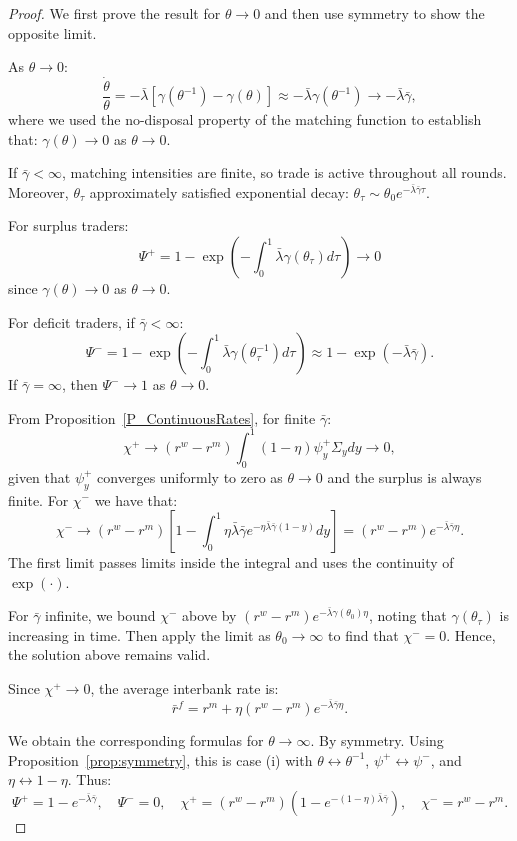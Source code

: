 
\begin{proof}
We first prove the result for $\theta \to 0$ and then use symmetry to show the opposite limit.

As $\theta \to 0$:
\[
\frac{\dot{\theta}}{\theta} = -\bar{\lambda}[\gamma(\theta^{-1}) - \gamma(\theta)] \approx -\bar{\lambda}\gamma(\theta^{-1}) \to -\bar{\lambda}\bar{\gamma},
\]
where we used the no-disposal property of the matching function to establish that: $\gamma(\theta)\to 0$ as $\theta \to 0$. 

If $\bar{\gamma} < \infty$, matching intensities are finite, so trade is active throughout all rounds. Moreover, $\theta_{\tau}$ approximately satisfied exponential decay: $\theta_{\tau} \sim \theta_0 e^{-\bar{\lambda}\bar{\gamma}\tau}$. 

For surplus traders:
\[
\Psi^{+} = 1 - \exp\left(-\int_0^1 \bar{\lambda}\gamma(\theta_{\tau})d\tau\right) \to 0
\]
since $\gamma(\theta) \to 0$ as $\theta \to 0$.

For deficit traders, if $\bar{\gamma} < \infty$:
\[
\Psi^{-} = 1 - \exp\left(-\int_0^1 \bar{\lambda}\gamma(\theta_{\tau}^{-1})d\tau\right) \approx 1 - \exp(-\bar{\lambda}\bar{\gamma}).
\]
If $\bar{\gamma} = \infty$, then $\Psi^{-} \to 1$ as $\theta \to 0$.

From Proposition~\ref{P_ContinuousRates}, for finite $\bar{\gamma}$:
\[
\chi^{+} \to (r^{w} - r^{m})\int_0^1 (1-\eta)\psi_y^{+} \Sigma_y dy \to 0,
\]
given that $\psi_y^{+}$ converges uniformly to zero as $\theta \to 0$ and the surplus is always finite.
For $\chi^{-}$ we have that:
\[
\chi^{-} \to (r^{w} - r^{m})\left[1 - \int_0^1 \eta\bar{\lambda}\bar{\gamma} e^{-\eta\bar{\lambda}\bar{\gamma}(1-y)}dy\right] = (r^{w} - r^{m})e^{-\bar{\lambda}\bar{\gamma}\eta}.
\]
The first limit passes limits inside the integral and uses the continuity of $\exp(\cdot)$. 

For $\bar{\gamma}$ infinite, we bound $\chi^{-}$ above by $(r^{w} - r^{m})e^{-\bar{\lambda}\gamma(\theta_0)\eta}$, noting that $\gamma(\theta_\tau)$ is increasing in time. Then apply the limit as $\theta_0 \to \infty$ to find that $\chi^{-}=0$. Hence, the solution above remains valid. 

Since $\chi^+\to 0$, the average interbank rate is:
\[
\bar{r}^f=r^m+\eta(r^{w} - r^{m})e^{-\bar{\lambda}\bar{\gamma}\eta}. 
\]

We obtain the corresponding formulas for $\theta \to \infty$. By symmetry. Using  Proposition~\ref{prop:symmetry}, this is case (i) with $\theta \leftrightarrow \theta^{-1}$, $\psi^{+} \leftrightarrow \psi^{-}$, and $\eta \leftrightarrow 1-\eta$. Thus:
\[
\Psi^{+} = 1 - e^{-\bar{\lambda}\bar{\gamma}}, \quad \Psi^{-} = 0,\quad
\chi^{+} = (r^{w} - r^{m})(1 - e^{-(1-\eta)\bar{\lambda}\bar{\gamma}}), \quad \chi^{-} = r^{w} - r^{m}.
\]
\end{proof}